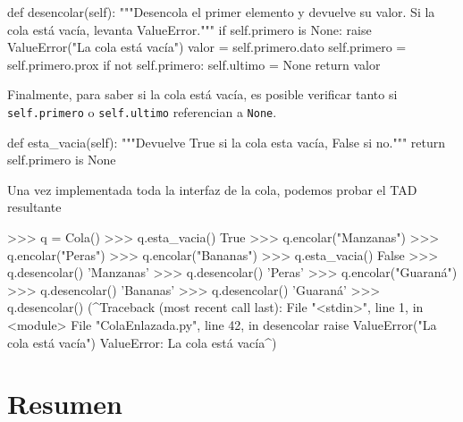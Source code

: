 \begin{codigo-python-sn}
    def desencolar(self):
        """Desencola el primer elemento y devuelve su valor.
           Si la cola está vacía, levanta ValueError."""
        if self.primero is None:
            raise ValueError("La cola está vacía")
        valor = self.primero.dato
        self.primero = self.primero.prox
        if not self.primero:
            self.ultimo = None
        return valor
\end{codigo-python-sn}

Finalmente, para saber si la cola está vacía, es posible verificar tanto si
\lstinline!self.primero! o \lstinline!self.ultimo! referencian a
\lstinline!None!.

\begin{codigo-python-sn}
    def esta_vacia(self):
        """Devuelve True si la cola esta vacía, False si no."""
        return self.primero is None
\end{codigo-python-sn}

Una vez implementada toda la interfaz de la cola, podemos probar el TAD
resultante

\begin{codigo-python-sn}
>>> q = Cola()
>>> q.esta_vacia()
True
>>> q.encolar("Manzanas")
>>> q.encolar("Peras")
>>> q.encolar("Bananas")
>>> q.esta_vacia()
False
>>> q.desencolar()
'Manzanas'
>>> q.desencolar()
'Peras'
>>> q.encolar("Guaraná")
>>> q.desencolar()
'Bananas'
>>> q.desencolar()
'Guaraná'
>>> q.desencolar()
(^Traceback (most recent call last):
  File "<stdin>", line 1, in <module>
  File "ColaEnlazada.py", line 42, in desencolar
    raise ValueError("La cola está vacía")
ValueError: La cola está vacía^)
\end{codigo-python-sn}


\section{Resumen}


